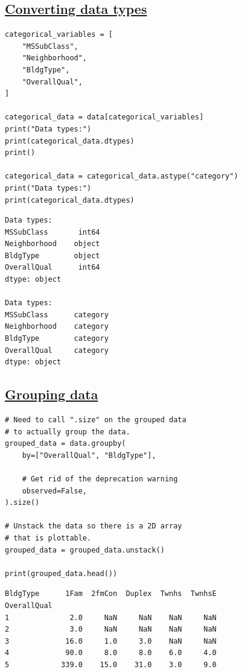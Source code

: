 \documentclass[11pt]{article}
\begin{document}
 \newpage
\subsection{\href{https://pandas.pydata.org/docs/reference/api/pandas.DataFrame.astype.html}{Converting data types}}
\label{sec:orgc3489d7}
\begin{verbatim}
categorical_variables = [
    "MSSubClass",
    "Neighborhood",
    "BldgType",
    "OverallQual",
]

categorical_data = data[categorical_variables]
print("Data types:")
print(categorical_data.dtypes)
print()

categorical_data = categorical_data.astype("category")
print("Data types:")
print(categorical_data.dtypes)
\end{verbatim}

\label{orgd513173}
\begin{verbatim}
Data types:
MSSubClass       int64
Neighborhood    object
BldgType        object
OverallQual      int64
dtype: object

Data types:
MSSubClass      category
Neighborhood    category
BldgType        category
OverallQual     category
dtype: object
\end{verbatim}

 \newpage
\subsection{\href{https://pandas.pydata.org/docs/reference/api/pandas.DataFrame.groupby.html}{Grouping data}}
\label{sec:orgaf6eb92}
\begin{verbatim}
# Need to call ".size" on the grouped data
# to actually group the data.
grouped_data = data.groupby(
    by=["OverallQual", "BldgType"],

    # Get rid of the deprecation warning
    observed=False,
).size()

# Unstack the data so there is a 2D array
# that is plottable.
grouped_data = grouped_data.unstack()

print(grouped_data.head())
\end{verbatim}

\label{org00aab96}
\begin{verbatim}
BldgType      1Fam  2fmCon  Duplex  Twnhs  TwnhsE
OverallQual                                      
1              2.0     NaN     NaN    NaN     NaN
2              3.0     NaN     NaN    NaN     NaN
3             16.0     1.0     3.0    NaN     NaN
4             90.0     8.0     8.0    6.0     4.0
5            339.0    15.0    31.0    3.0     9.0
\end{verbatim}
\end{document}
